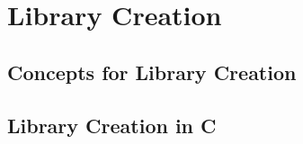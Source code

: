 \chapter{Library Creation} %
\label{cha:library_creation}

\section{Concepts for Library Creation} %
\label{sec:concepts_for_library_creation}




\clearpage
\section{Library Creation in C} %
\label{sec:library_creation_in_c}






